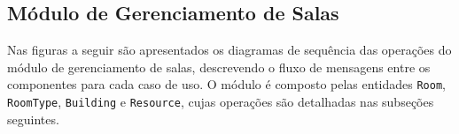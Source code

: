 \subsection{Módulo de Gerenciamento de Salas}

Nas figuras a seguir são apresentados os diagramas de sequência das operações do módulo de gerenciamento de salas,
descrevendo o fluxo de mensagens entre os componentes para cada caso de uso.
O módulo é composto pelas entidades \texttt{Room}, \texttt{RoomType}, \texttt{Building} e \texttt{Resource},
cujas operações são detalhadas nas subseções seguintes.








